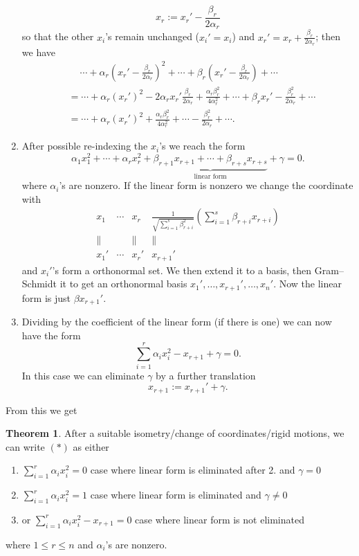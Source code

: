 \documentclass[a4paper]{article}
\theoremstyle{definition}
\newtheorem{thm}[defn]{Theorem}
\begin{document}
\begin{enumerate}
    \[
    x_r:=x_r' - \frac{\beta_r}{2\alpha_r}
    \]
    so that the other $x_i$'s remain unchanged ($x_i'=x_i$) and $x_r'=x_r+\frac{\beta_r}{2\alpha_r}$; then we have
    \[
    \begin{aligned}
    &\quad \ \cdots + \alpha_r \left(x_r' - \frac{\beta_r}{2\alpha_r}\right)^2 + \cdots + \beta_r \left(x_r' - \frac{\beta_r}{2\alpha_r}\right) +\cdots \\
    &= \cdots+\alpha_r \left(x_r'\right)^2 - 2\alpha_r x_r' \frac{\beta_r}{2\alpha_r} + \frac{\alpha_r\beta_r^2}{4\alpha_r^2} + \cdots + \beta_r x_r' - \frac{\beta_r^2}{2\alpha_r} + \cdots \\
    &= \cdots + \alpha_r \left(x_r'\right)^2 + \frac{\alpha_r\beta_r^2}{4\alpha_r^2} + \cdots - \frac{\beta_r^2}{2\alpha_r} + \cdots .
    \end{aligned}
    \]
    \item After possible re-indexing the $x_i$'s we reach the form
    \[
    \alpha_1 x_1^2 + \cdots + \alpha_r x_r^2 + \underbrace{\beta_{r+1} x_{r+1} + \cdots + \beta_{r+s} x_{r+s}}_{\text{linear form}} + \gamma =0.
    \]
    where $\alpha_i$'s are nonzero. If the linear form is nonzero we change the coordinate with
    \[
    \begin{array}{cccc}
        x_1 & \cdots & x_r & \displaystyle \frac{1}{\sqrt{\sum_{i=1}^s \beta_{r+i}^2}} \left(\sum_{i=1}^s \beta_{r+i}x_{r+i} \right) \\
        \| & & \| & \| \\
        x_1' & \cdots & x_r' & x_{r+1}'
    \end{array}
    \]
    and $x_i'$'s form a orthonormal set. We then extend it to a basis, then Gram--Schmidt it to get an orthonormal basis $x_1',\ldots,x_{r+1}',\ldots,x_n'$. Now the linear form is just $\beta x_{r+1}'$.
    \item Dividing by the coefficient of the linear form (if there is one) we can now have the form
    \[
    \sum_{i=1}^r \alpha_i x_i^2 -x_{r+1} + \gamma =0.
    \]
    In this case we can eliminate $\gamma$ by a further translation
    \[
    x_{r+1}:=x_{r+1}'+\gamma .
    \]
\end{enumerate}
From this we get
\begin{thm}
After a suitable isometry/change of coordinates/rigid motions, we can write $(\ast)$ as either
\begin{enumerate}
    \item $\displaystyle \sum_{i=1}^r \alpha_i x_i^2=0$ \qquad case where linear form is eliminated after 2. and $\gamma=0$
    \item $\displaystyle \sum_{i=1}^r \alpha_i x_i^2=1$ \qquad case where linear form is eliminated and $\gamma\neq 0$
    \item or $\displaystyle \sum_{i=1}^r \alpha_i x_i^2 - x_{r+1}=0$ \qquad case where linear form is not eliminated
\end{enumerate}
where $1\leq r\leq n$ and $\alpha_i$'s are nonzero.
\end{thm}
\end{document}
